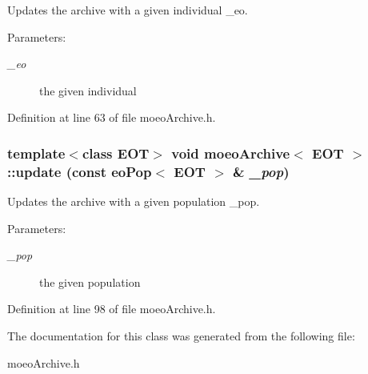 Updates the archive with a given individual \_\-eo. 

\begin{Desc}
\item[Parameters:]
\begin{description}
\item[{\em \_\-eo}]the given individual \end{description}
\end{Desc}


Definition at line 63 of file moeo\-Archive.h.
\subsubsection{\setlength{\rightskip}{0pt plus 5cm}template$<$class EOT$>$ void {\bf moeo\-Archive}$<$ EOT $>$::update (const {\bf eo\-Pop}$<$ EOT $>$ \& {\em \_\-pop})\hspace{0.3cm}{\tt  [inline]}}\label{classmoeoArchive_58e891ab400ba352e8b0a341d0bdc107}


Updates the archive with a given population \_\-pop. 

\begin{Desc}
\item[Parameters:]
\begin{description}
\item[{\em \_\-pop}]the given population \end{description}
\end{Desc}


Definition at line 98 of file moeo\-Archive.h.

The documentation for this class was generated from the following file:\begin{CompactItemize}
\item 
moeo\-Archive.h\end{CompactItemize}
